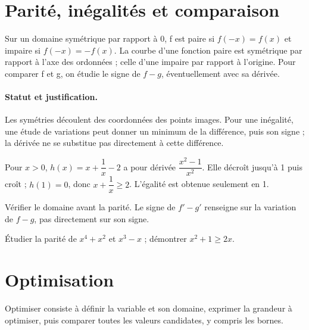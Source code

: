 \section{Parité, inégalités et comparaison}\label{C06-U4}
\begin{keypoint}
Sur un domaine symétrique par rapport à 0, f est paire si $f(-x)=f(x)$ et impaire si $f(-x)=-f(x)$. La courbe d’une fonction paire est symétrique par rapport à l’axe des ordonnées ; celle d’une impaire par rapport à l’origine. Pour comparer f et g, on étudie le signe de $f-g$, éventuellement avec sa dérivée.
\end{keypoint}
\paragraph{Statut et justification.} Les symétries découlent des coordonnées des points images. Pour une inégalité, une étude de variations peut donner un minimum de la différence, puis son signe ; la dérivée ne se substitue pas directement à cette différence.
\begin{example}Pour $x>0$, $h(x)=x+\dfrac{1}{x}-2$ a pour dérivée $\dfrac{x^2-1}{x^2}$. Elle décroît jusqu’à 1 puis croît ; $h(1)=0$, donc $x+\dfrac{1}{x}\geq 2$. L’égalité est obtenue seulement en 1.\end{example}\label{C06-EX4}
\begin{pitfall}Vérifier le domaine avant la parité. Le signe de $f\prime-g\prime$ renseigne sur la variation de $f-g$, pas directement sur son signe.\end{pitfall}
\begin{application}Étudier la parité de $x^4+x^2$ et $x^3-x$ ; démontrer $x^2+1\geq2x$.\end{application}\label{C06-AP4}
\section{Optimisation}\label{C06-U5}
\begin{keypoint}
Optimiser consiste à définir la variable et son domaine, exprimer la grandeur à optimiser, puis comparer toutes les valeurs candidates, y compris les bornes.
\end{keypoint}
